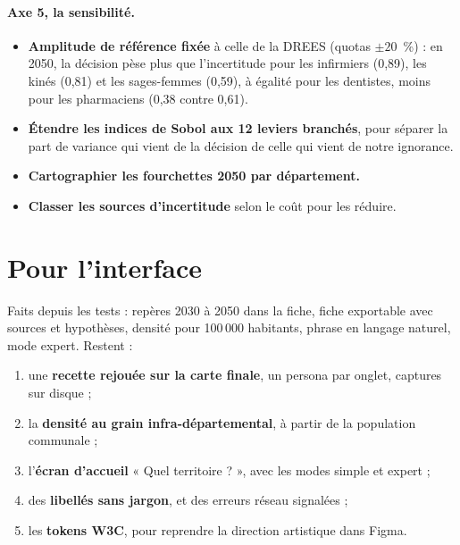 \paragraph{Axe 5, la sensibilité.}
\begin{itemize}
  \item \textbf{Amplitude de référence fixée} à celle de la DREES (quotas $\pm 20$~\%) : en 2050, la décision pèse
        plus que l'incertitude pour les infirmiers (0,89), les kinés (0,81) et les sages-femmes (0,59), à égalité pour
        les dentistes, moins pour les pharmaciens (0,38 contre 0,61).
  \item \textbf{Étendre les indices de Sobol aux 12 leviers branchés}, pour séparer la part de
        variance qui vient de la décision de celle qui vient de notre ignorance.
  \item \textbf{Cartographier les fourchettes 2050 par département.}
  \item \textbf{Classer les sources d'incertitude} selon le coût pour les réduire.
\end{itemize}

\section{Pour l'interface}
Faits depuis les tests : repères 2030 à 2050 dans la fiche, fiche exportable avec sources et hypothèses, densité pour
100\,000 habitants, phrase en langage naturel, mode expert. Restent :
\begin{enumerate}
  \item une \textbf{recette rejouée sur la carte finale}, un persona par onglet, captures sur disque ;
  \item la \textbf{densité au grain infra-départemental}, à partir de la population communale ;
  \item l'\textbf{écran d'accueil} « Quel territoire ? », avec les modes simple et expert ;
  \item des \textbf{libellés sans jargon}, et des erreurs réseau signalées ;
  \item les \textbf{tokens W3C}, pour reprendre la direction artistique dans Figma.
\end{enumerate}

